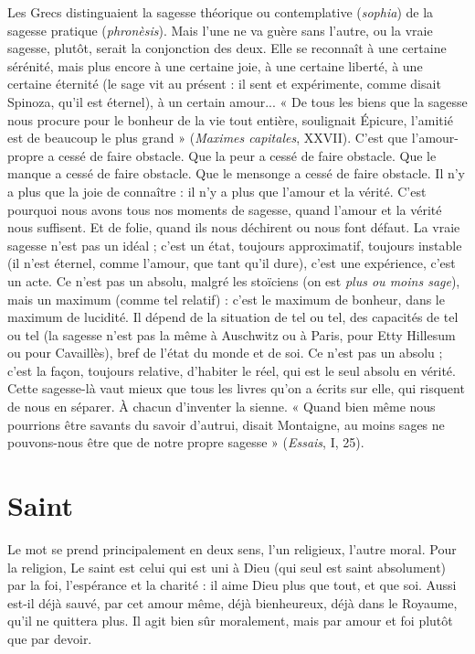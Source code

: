 Les Grecs distinguaient la sagesse théorique ou contemplative ({\it sophia}) de la
sagesse pratique ({\it phronèsis}). Mais l’une ne va guère sans l’autre, ou la vraie
sagesse, plutôt, serait la conjonction des deux. Elle se reconnaît à une certaine
sérénité, mais plus encore à une certaine joie, à une certaine liberté, à une certaine
éternité (le sage vit au présent : il sent et expérimente, comme disait Spinoza,
qu'il est éternel), à un certain amour... « De tous les biens que la sagesse
nous procure pour le bonheur de la vie tout entière, soulignait Épicure, l'amitié
est de beaucoup le plus grand » ({\it Maximes capitales}, XXVII). C’est que l'amour-propre
a cessé de faire obstacle. Que la peur a cessé de faire obstacle. Que le
manque a cessé de faire obstacle. Que le mensonge a cessé de faire obstacle. Il
n’y a plus que la joie de connaître : il n’y a plus que l'amour et la vérité. C’est
pourquoi nous avons tous nos moments de sagesse, quand l’amour et la vérité
nous suffisent. Et de folie, quand ils nous déchirent ou nous font défaut. La
vraie sagesse n’est pas un idéal ; c’est un état, toujours approximatif, toujours
instable (il n’est éternel, comme l'amour, que tant qu’il dure), c’est une expérience,
c’est un acte. Ce n’est pas un absolu, malgré les stoïciens (on est {\it plus ou
moins sage}), mais un maximum (comme tel relatif) : c’est le maximum de bonheur,
dans le maximum de lucidité. Il dépend de la situation de tel ou tel, des
capacités de tel ou tel (la sagesse n’est pas la même à Auschwitz ou à Paris, pour
Etty Hillesum ou pour Cavaillès), bref de l’état du monde et de soi. Ce n’est
pas un absolu ; c’est la façon, toujours relative, d’habiter le réel, qui est le seul
absolu en vérité. Cette sagesse-là vaut mieux que tous les livres qu’on a écrits
sur elle, qui risquent de nous en séparer. À chacun d'inventer la sienne.
« Quand bien même nous pourrions être savants du savoir d’autrui, disait
Montaigne, au moins sages ne pouvons-nous être que de notre propre sagesse »
({\it Essais}, I, 25).

\section{Saint}
Le mot se prend principalement en deux sens, l’un religieux, l'autre
moral.
Pour la religion, Le saint est celui qui est uni à Dieu (qui seul est saint absolument)
par la foi, l’espérance et la charité : il aime Dieu plus que tout, et que
soi. Aussi est-il déjà sauvé, par cet amour même, déjà bienheureux, déjà dans le
Royaume, qu'il ne quittera plus. Il agit bien sûr moralement, mais par amour
et foi plutôt que par devoir.

